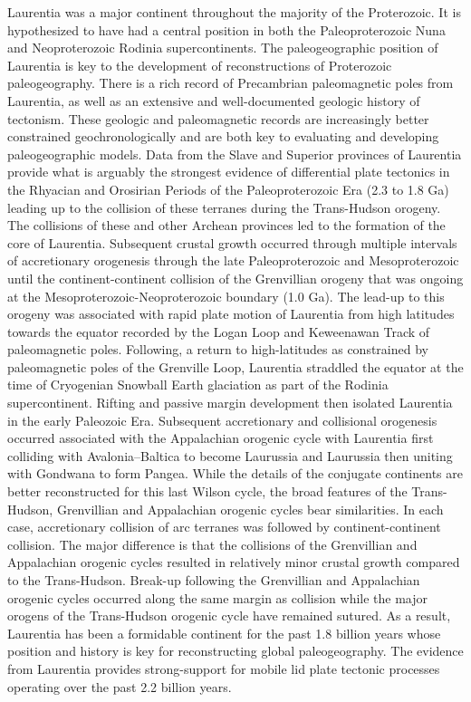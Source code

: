 \documentclass[11pt,letterpaper]{article}
\begin{document}
Laurentia was a major continent throughout the majority of the Proterozoic. It is hypothesized to have had a central position in both the Paleoproterozoic Nuna and Neoproterozoic Rodinia supercontinents. The paleogeographic position of Laurentia is key to the development of reconstructions of Proterozoic paleogeography. There is a rich record of Precambrian paleomagnetic poles from Laurentia, as well as an extensive and well-documented geologic history of tectonism. These geologic and paleomagnetic records are increasingly better constrained geochronologically and are both key to evaluating and developing paleogeographic models. Data from the Slave and Superior provinces of Laurentia provide what is arguably the strongest evidence of differential plate tectonics in the Rhyacian and Orosirian Periods of the Paleoproterozoic Era (2.3 to 1.8 Ga) leading up to the collision of these terranes during the Trans-Hudson orogeny. The collisions of these and other Archean provinces led to the formation of the core of Laurentia. Subsequent crustal growth occurred through multiple intervals of accretionary orogenesis through the late Paleoproterozoic and Mesoproterozoic until the continent-continent collision of the Grenvillian orogeny that was ongoing at the Mesoproterozoic-Neoproterozoic boundary (1.0 Ga). The lead-up to this orogeny was associated with rapid plate motion of Laurentia from high latitudes towards the equator recorded by the Logan Loop and Keweenawan Track of paleomagnetic poles. Following, a return to high-latitudes as constrained by paleomagnetic poles of the Grenville Loop, Laurentia straddled the equator at the time of Cryogenian Snowball Earth glaciation as part of the Rodinia supercontinent. Rifting and passive margin development then isolated Laurentia in the early Paleozoic Era. Subsequent accretionary and collisional orogenesis occurred associated with the Appalachian orogenic cycle with Laurentia first colliding with Avalonia–Baltica to become Laurussia and Laurussia then uniting with Gondwana to form Pangea. While the details of the conjugate continents are better reconstructed for this last Wilson cycle, the broad features of the Trans-Hudson, Grenvillian and Appalachian orogenic cycles bear similarities. In each case, accretionary collision of arc terranes was followed by continent-continent collision. The major difference is that the collisions of the Grenvillian and Appalachian orogenic cycles resulted in relatively minor crustal growth compared to the Trans-Hudson. Break-up following the Grenvillian and Appalachian orogenic cycles occurred along the same margin as collision while the major orogens of the Trans-Hudson orogenic cycle have remained sutured. As a result, Laurentia has been a formidable continent for the past 1.8 billion years whose position and history is key for reconstructing global paleogeography. The evidence from Laurentia provides strong-support for mobile lid plate tectonic processes operating over the past 2.2 billion years.
\end{document}
